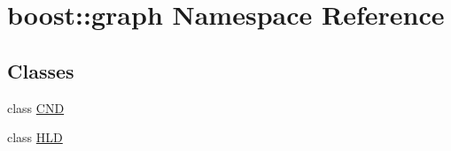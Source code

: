 \hypertarget{namespaceboost_1_1graph}{}\section{boost\+:\+:graph Namespace Reference}
\label{namespaceboost_1_1graph}
\subsection*{Classes}
\begin{DoxyCompactItemize}
\item 
class \hyperlink{classboost_1_1graph_1_1CND}{C\+ND}
\item 
class \hyperlink{classboost_1_1graph_1_1HLD}{H\+LD}
\end{DoxyCompactItemize}
